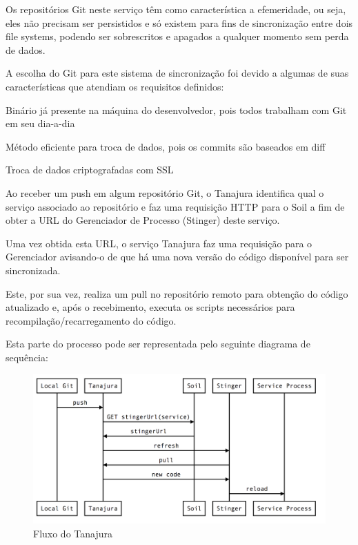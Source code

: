 \documentclass[]{politex}
\begin{document}
	Os repositórios Git neste serviço têm como característica a efemeridade, ou seja, eles não precisam ser persistidos e só existem para fins de sincronização entre dois file systems, podendo ser sobrescritos e apagados a qualquer momento sem perda de dados.
	
	A escolha do Git para este sistema de sincronização foi devido a algumas de suas características que atendiam os requisitos definidos:
	
	Binário já presente na máquina do desenvolvedor, pois todos trabalham com Git em seu dia-a-dia
	
	Método eficiente para troca de dados, pois os commits são baseados em diff
	
	Troca de dados criptografadas com SSL

	Ao receber um push em algum repositório Git, o Tanajura identifica qual o serviço associado ao repositório e faz uma requisição HTTP para o Soil a fim de obter a URL do Gerenciador de Processo (Stinger) deste serviço.
	
	Uma vez obtida esta URL, o serviço Tanajura faz uma requisição para o Gerenciador avisando-o de que há uma nova versão do código disponível para ser sincronizada.
	
	Este, por sua vez, realiza um pull no repositório remoto para obtenção do código atualizado e, após o recebimento, executa os scripts necessários para recompilação/recarregamento do código.
	
	Esta parte do processo pode ser representada pelo seguinte diagrama de sequência:
		\begin{figure}[htb]
			\caption{\label{fig_arquitetura2}Fluxo do Tanajura}
			\begin{center}
			\includegraphics[scale=0.20]{tanajura-flow.png}
			\end{center}
		\end{figure}
\end{document}

